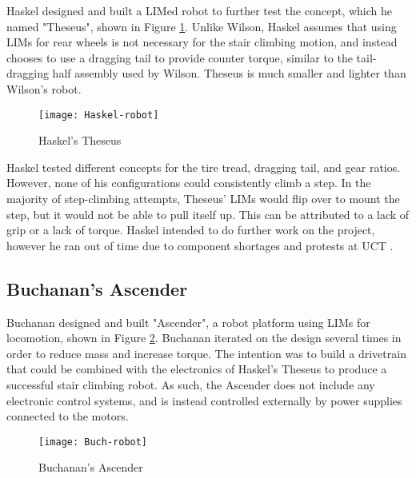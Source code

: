 Haskel designed and built a LIMed robot to further test the concept, which he named "Theseus", shown in Figure \ref{Haskel robot}. Unlike Wilson, Haskel assumes that using LIMs for rear wheels is not necessary for the stair climbing motion, and instead chooses to use a dragging tail to provide counter torque, similar to the tail-dragging half assembly used by Wilson. Theseus is much smaller and lighter than Wilson's robot.

\begin{figure}[h]
	\centering
	\texttt{[image: Haskel-robot]}
	\caption{Haskel's Theseus \citep{Haskel-2017}}
	\label{Haskel robot}
\end{figure}

Haskel tested different concepts for the tire tread, dragging tail, and gear ratios. However, none of his configurations could consistently climb a step. In the majority of step-climbing attempts, Theseus' LIMs would flip over to mount the step, but it would not be able to pull itself up. This can be attributed to a lack of grip or a lack of torque. Haskel intended to do further work on the project, however he ran out of time due to component shortages and protests at UCT \citep{Haskel-2017}.

\subsection{Buchanan's Ascender} %

Buchanan designed and built "Ascender", a robot platform using LIMs for locomotion, shown in Figure \ref{Buch robot}. Buchanan iterated on the design several times in order to reduce mass and increase torque. The intention was to build a drivetrain that could be combined with the electronics of Haskel's Theseus to produce a successful stair climbing robot. As such, the Ascender does not include any electronic control systems, and is instead controlled externally by power supplies connected to the motors.

\begin{figure}[h]
	\centering
	\texttt{[image: Buch-robot]}
	\caption{Buchanan's Ascender \citep{Buchanan-2018}}
	\label{Buch robot}
\end{figure}

